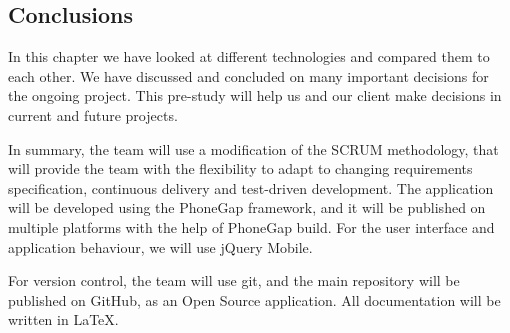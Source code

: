 \subsection{Conclusions}
In this chapter we have looked at different technologies and compared them to each other.  We have discussed and concluded on many important decisions for the ongoing project. This pre-study will help us and our client make decisions in current and future projects.

In summary, the team will use a modification of the SCRUM methodology, that will provide the team with the flexibility to adapt to changing requirements specification, continuous delivery and test-driven development. The application will be developed using the PhoneGap framework, and it will be published on multiple platforms with the help of PhoneGap build. For the user interface and application behaviour, we will use jQuery Mobile.

For version control, the team will use git, and the main repository will be published on GitHub, as an Open Source application. All documentation will be written in LaTeX.

